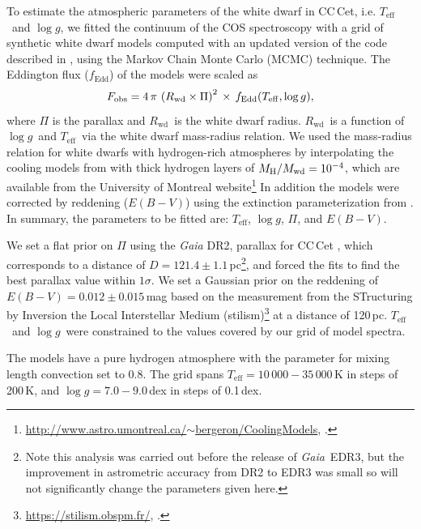 \documentclass[fleqn,usenatbib]{mnras}
\newcommand{\Rwd}{\mbox{$R_{\mathrm{wd}}$}}
\newcommand{\Mwd}{\mbox{$M_{\mathrm{wd}}$}}
\newcommand{\Teff}{\mbox{$T_{\mathrm{eff}}$}}
\newcommand{\logg}{\mbox{$\log g$}}
\begin{document}
To estimate the atmospheric parameters of the white dwarf in CC\,Cet, i.e. \Teff\ and \logg, we fitted the continuum of the COS spectroscopy with a grid of synthetic white dwarf models computed with an updated version of the code described in \citet{koester10-1}, using the Markov Chain Monte Carlo (MCMC) technique. The Eddington flux ($f_\text{Edd}$) of the models were scaled as
\begin{equation}
    F_{\rm obs} = 4\,\pi\,\left(\Rwd \times \Pi\right)^{2}\,\times\,f_{\rm Edd}(\Teff, \logg),
    \label{eq:model}
\end{equation}
where $\Pi$ is the parallax and \Rwd\ is the white dwarf radius. \Rwd\ is a function of \logg\ and \Teff\ via the white dwarf mass-radius relation. We used the mass-radius relation for white dwarfs with hydrogen-rich atmospheres by interpolating the cooling models from \citet{fontaineetal01-1} with thick hydrogen layers of $M_{\rm H}/\Mwd=10^{-4}$, which are available from the University of Montreal website\footnote{\href{http://www.astro.umontreal.ca/~bergeron/CoolingModels}{http://www.astro.umontreal.ca/$\sim$bergeron/CoolingModels}, \citet{bergeronetal95-2, holberg+bergeron06-1, tremblayetal11-2,kowalski+saumon06-1}.} 
In addition the models were corrected by reddening ($E(B-V)$) using the extinction parameterization from  \citet{fitzpatrick99-1}. In summary, the parameters to be fitted are: \Teff, \logg, $\Pi$, and $E(B-V)$.

We set a flat prior on $\Pi$ using the \textit{Gaia} DR2, parallax for CC\,Cet \citep[$\Pi=8.2381\pm0.0758$\,mas, \textit{Gaia} source id~=~15207693216816512][]{gaia18-1}, which corresponds to a distance of $D=121.4\pm1.1$\,pc\footnote{Note this analysis was carried out before the release of \textit{Gaia}\, EDR3, but the improvement in astrometric accuracy from DR2 to EDR3 was small so will not significantly change the parameters given here.}, and forced the fits to find the best parallax value within $1\sigma$. We set a Gaussian prior on the reddening of $E(B-V)=0.012 \pm 0.015$\,mag based on the measurement from the STructuring by Inversion the Local Interstellar Medium (stilism)\footnote{\href{https://stilism.obspm.fr/}{https://stilism.obspm.fr/}, \citet{lallementetal14-1, lallementetal18-1, capitanioetal17-1}.} at a distance of 120\,pc. \Teff\ and \logg\ were constrained to the values covered by our grid of model spectra.

The models have a pure hydrogen atmosphere with the parameter for mixing length convection set to 0.8. The grid spans $\Teff=10\,000-35\,000$\,K in steps of 200\,K, and $\logg=7.0-9.0$\,dex in steps of 0.1\,dex.
\end{document}
